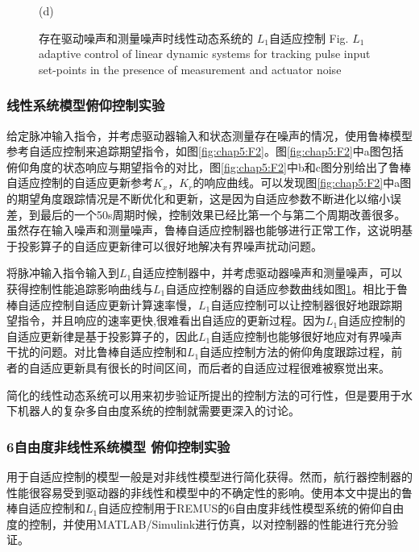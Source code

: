 \begin{figure}[!htp]
\begin{minipage}{0.48\linewidth}
  \centerline{(d) }
\end{minipage}
\label{fig:chap5:F3}
 {存在驱动噪声和测量噪声时线性动态系统的 \texorpdfstring {$L_1$}{}{自适应控制} } {Fig.}{ \texorpdfstring {$L_1$}{} {adaptive control of linear dynamic systems for tracking pulse input set-points in the presence of measurement and actuator noise} }
\end{figure}

\subsubsection{线性系统模型俯仰控制实验 }

给定脉冲输入指令，并考虑驱动器输入和状态测量存在噪声的情况，使用鲁棒模型参考自适应控制来追踪期望指令，如图\ref{fig:chap5:F2}。图\ref{fig:chap5:F2}中a图包括俯仰角度的状态响应与期望指令的对比，图\ref{fig:chap5:F2}中b和c图分别给出了鲁棒自适应控制的自适应更新参考$K_x$，$K_r$的响应曲线。可以发现图\ref{fig:chap5:F2}中a图的期望角度跟踪情况是不断优化和更新，这是因为自适应参数不断进化以缩小误差，到最后的一个50s周期时候，控制效果已经比第一个与第二个周期改善很多。虽然存在输入噪声和测量噪声，鲁棒自适应控制器也能够进行正常工作，这说明基于投影算子的自适应更新律可以很好地解决有界噪声扰动问题。

将脉冲输入指令输入到$L_1$自适应控制器中，并考虑驱动器噪声和测量噪声，可以获得控制性能追踪影响曲线与$L_1$自适应控制器的自适应参数曲线如图\ref{fig:chap5:F3}。相比于鲁棒自适应控制自适应更新计算速率慢，$L_1$自适应控制可以让控制器很好地跟踪期望指令，并且响应的速率更快,很难看出自适应的更新过程。因为$L_1$自适应控制的自适应更新律是基于投影算子的，因此$L_1$自适应控制也能够很好地应对有界噪声干扰的问题。对比鲁棒自适应控制和$L_1$自适应控制方法的俯仰角度跟踪过程，前者的自适应更新具有很长的时间区间，而后者的自适应过程很难被察觉出来。

简化的线性动态系统可以用来初步验证所提出的控制方法的可行性，但是要用于水下机器人的复杂多自由度系统的控制就需要更深入的讨论。

\subsubsection{6自由度非线性系统模型 俯仰控制实验 }

用于自适应控制的模型一般是对非线性模型进行简化获得。然而，航行器控制器的性能很容易受到驱动器的非线性和模型中的不确定性的影响。使用本文中提出的鲁棒自适应控制和$L_1$自适应控制用于REMUS的6自由度非线性模型系统的俯仰自由度的控制，并使用MATLAB/Simulink进行仿真，以对控制器的性能进行充分验证。

